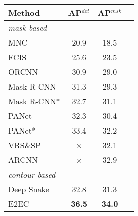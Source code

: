 \documentclass[10pt,twocolumn,letterpaper]{article}
\begin{document}
\begin{table*}[t]
\begin{minipage}[c]{0.75\linewidth}
\begin{footnotesize}
\begin{tabular}{l|l|l|cc c c c c c c c c c c}
  \end{tabular}\vspace{-3mm}
  \end{footnotesize}
  \caption{\textbf{Results obtained on the Cityscapes test set.} * means that the multi-component detection is used to integrate several components into a complete instance. The proposed E2EC method outperforms Deep Snake \cite{deepsnake} in all the categories.}
  \label{tab:city}
\end{minipage}\hfill
\begin{minipage}[c]{0.03\linewidth}
\end{minipage}\hfill
\begin{minipage}[c]{0.22\linewidth}\vspace{-2mm}
  \centering
  \setlength{\tabcolsep}{0.2mm}
  \begin{footnotesize}
  \begin{tabular}{l|c|cc}
    Method & AP$^{det}$ & AP$^{msk}$\\
    \hline
    \emph{mask-based} & & &\\
    MNC \cite{mnc} & 20.9 & 18.5\\
    FCIS \cite{fcis} & 25.6 & 23.5\\
    ORCNN \cite{orcnn} & 30.9 & 29.0\\
    Mask R-CNN \cite{maskrcnn} & 31.3 & 29.3\\
    Mask R-CNN* \cite{kins} & 32.7 & 31.1\\
    PANet \cite{panet} & 32.3 & 30.4\\
    PANet* \cite{kins} & 33.4 & 32.2\\
    VRS\&SP \cite{vrssp} & × & 32.1\\
    ARCNN \cite{arcnn} & × & 32.9\\
    \hline
    \emph{contour-based}& & &\\
    Deep Snake \cite{deepsnake} & 32.8 & 31.3\\
    E2EC & \textbf{36.5} & \textbf{34.0}\\
  \end{tabular}\vspace{-4mm}
  \end{footnotesize}
  \caption{\textbf{Results obtained on the KINS test set.} * denotes with ASN proposed by \cite{kins}.}
  \label{tab:kins}
\end{minipage}\hfill\vspace{-3mm}
\end{table*}
\end{document}
